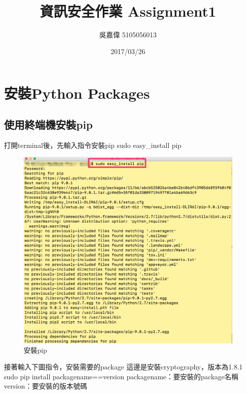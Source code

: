 \documentclass[12pt,a4paper]{article}
\title{\huge 資訊安全作業 Assignment1} %
\author{吳嘉偉 5105056013} %
\date{2017/03/26} %
\begin{document}
\clearpage

\maketitle %

\section{安裝Python Packages}

\subsection{使用終端機安裝pip}

{
\fontsize{14pt}{10pt} %
\selectfont %
打開terminal後，先輸入指令安裝pip
\newline sudo easy\_install pip

\begin{figure}[ht]
	\begin{center}
		\includegraphics[scale=0.3]{image/termanal1.png}
		\caption{安裝pip}
	\end{center}
\end{figure}

\newpage %
接著輸入下圖指令，安裝需要的package
\newline 這邊是安裝cryptography，版本為1.8.1
\newline sudo pip install packagename==version
\newline packagename：要安裝的package名稱
\newline version：要安裝的版本號碼

}
\end{document}
